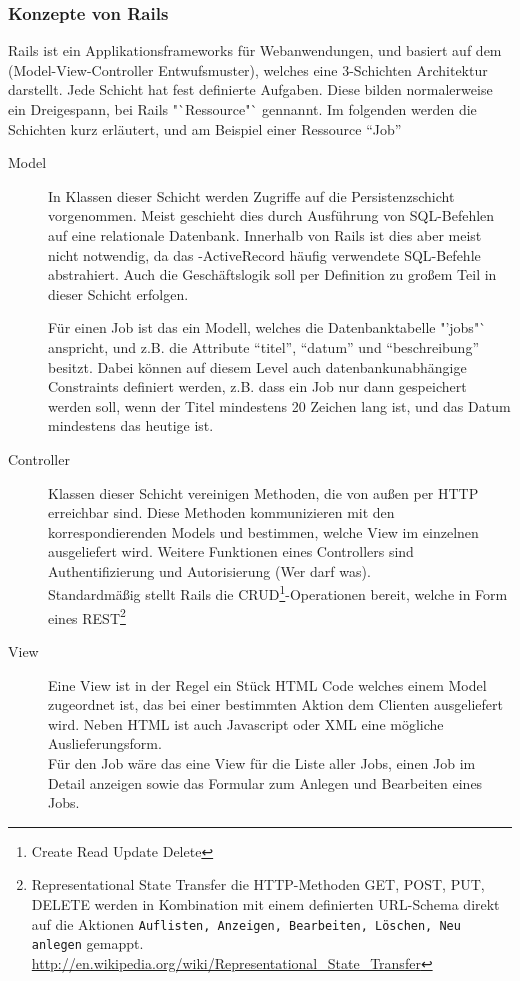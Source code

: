 \subsubsection{Konzepte von Rails}
\label{sec:railsconcepts}
Rails ist ein Applikationsframeworks für Webanwendungen, und basiert auf dem  (Model-View-Controller Entwufsmuster), welches eine 3-Schichten Architektur darstellt. Jede Schicht hat fest definierte Aufgaben. Diese bilden normalerweise ein Dreigespann, bei Rails "`Ressource"` gennannt. Im folgenden werden die Schichten kurz erläutert, und am Beispiel einer Ressource "`Job"'
\begin{description}
 \item[Model] In Klassen dieser Schicht werden Zugriffe auf die Persistenzschicht vorgenommen. Meist geschieht dies durch Ausführung von SQL-Befehlen auf eine relationale Datenbank. Innerhalb von Rails ist dies aber meist nicht notwendig, da das -ActiveRecord häufig verwendete SQL-Befehle abstrahiert. Auch die Geschäftslogik soll per Definition zu großem Teil in dieser Schicht erfolgen.
 
 Für einen Job ist das ein Modell, welches die Datenbanktabelle "'jobs"` anspricht, und z.B. die Attribute "`titel"', "`datum"' und "`beschreibung"' besitzt. Dabei können auf diesem Level auch datenbankunabhängige Constraints definiert werden, z.B. dass ein Job nur dann gespeichert werden soll, wenn der Titel mindestens 20 Zeichen lang ist, und das Datum mindestens das heutige ist.
 \item[Controller] Klassen dieser Schicht vereinigen Methoden, die von außen per HTTP erreichbar sind. Diese Methoden kommunizieren mit den korrespondierenden Models und bestimmen, welche View im einzelnen ausgeliefert wird. Weitere Funktionen eines Controllers sind Authentifizierung und Autorisierung (Wer darf was).\\
 Standardmäßig stellt Rails die CRUD\footnote{Create Read Update Delete}-Operationen bereit, welche in Form eines REST\footnote{Representational State Transfer die HTTP-Methoden GET, POST, PUT, DELETE werden in Kombination mit einem definierten URL-Schema direkt auf die Aktionen \texttt{Auflisten, Anzeigen, Bearbeiten, Löschen, Neu anlegen} gemappt.
 \url{http://en.wikipedia.org/wiki/Representational_State_Transfer}}
 \item[View] Eine View ist in der Regel ein Stück HTML Code welches einem Model zugeordnet ist, das bei einer bestimmten Aktion dem Clienten ausgeliefert wird. Neben HTML ist auch Javascript oder XML eine mögliche Auslieferungsform.\\
 Für den Job wäre das eine View für die Liste aller Jobs, einen Job im Detail anzeigen sowie das Formular zum Anlegen und Bearbeiten eines Jobs.
 \end{description}
